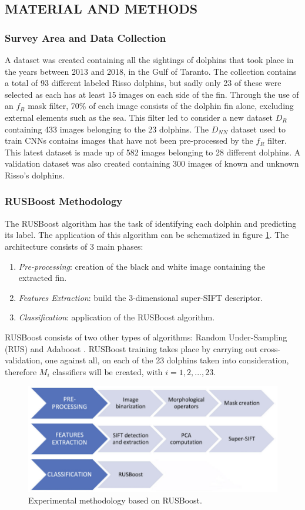 \subsection{MATERIAL AND METHODS}
\subsubsection{Survey Area and Data Collection}
A dataset was created containing all the sightings of dolphins that took place 
in the years between 2013 and 2018, in the Gulf of Taranto. The collection 
contains a total of 93 different labeled Risso dolphins, but sadly only 23 of 
these were selected as each has at least 15 images on each side of the fin. 
Through the use of an $f_R$ mask filter, 70\% of each image consists of the 
dolphin fin alone, excluding external elements such as the sea. This filter 
led to consider a new dataset $D_R$ containing 433 images belonging to the 23 
dolphins. The $D_{NN}$ dataset used to train CNNs contains images that have 
not been pre-processed by the $f_R$ filter. This latest dataset is made up of 
582 images belonging to 28 different dolphins. A validation dataset was also 
created containing 300 images of known and unknown Risso's dolphins.

\subsubsection{RUSBoost Methodology}
The RUSBoost algorithm has the task of identifying each dolphin and predicting 
its label. The application of this algorithm can be schematized in 
figure \ref{fig:RUSBoost}. The architecture consists of 3 main phases:
\begin{enumerate}
    \item \emph{Pre-processing}: creation of the black and white image containing the 
    extracted fin.
    \item \emph{Features Extraction}: build the 3-dimensional super-SIFT descriptor. 
    \item \emph{Classification}: application of the RUSBoost algorithm.
\end{enumerate}
RUSBoost consists of two other types of algorithms: Random Under-Sampling 
(RUS) and Adaboost \cite{0907875811}. RUSBoost training takes place by carrying out 
cross-validation, one against all, on each of the 23 dolphins taken into consideration, 
therefore $M_i$ classifiers will be created, with $i = 1,2,...,23$.
\begin{figure}[h!]
    \centering
    \includegraphics[width = 0.8\linewidth]{images/paper10/RUSBoost.png}
    \centering
    \caption{Experimental methodology based on RUSBoost.}
    \label{fig:RUSBoost}
\end{figure}

